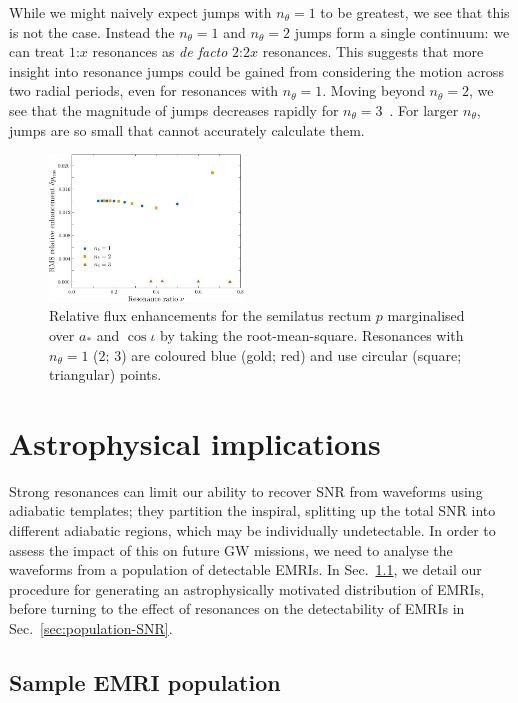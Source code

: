 \documentclass[aps,prd,amsfonts,amssymb,amsmath,nofootinbib,showpacs,superscriptaddress,twocolumn,floatfix]{revtex4-1}
\newcommand{\secref}[1]{Sec.~\ref{sec:#1}}
\begin{document}
While we might naively expect jumps with $n_\theta = 1$ to be greatest, we see that this is not the case. Instead the $n_\theta = 1$ and $n_\theta = 2$ jumps form a single continuum: we can treat $1$:$x$ resonances as \emph{de facto} $2$:$2x$ resonances. This suggests that more insight into resonance jumps could be gained from considering the motion across two radial periods, even for resonances with $n_\theta = 1$. Moving beyond $n_\theta = 2$, we see that the magnitude of jumps decreases rapidly for $n_\theta = 3$~\cite{Flanagan2012a}. For larger $n_\theta$, jumps are so small that cannot accurately calculate them.

\begin{figure}
\centering
\includegraphics[width=0.46\textwidth]{Fig_nu_rms_p}
\caption{\label{fig:res-flux-rms-p-vsnu}Relative flux enhancements for the semilatus rectum $p$ marginalised over $a_\ast$ and $\cos\iota$ by taking the root-mean-square. Resonances with $n_\theta = 1$ ($2$; $3$) are coloured blue (gold; red) and use circular (square; triangular) points.}
\end{figure}

\section{Astrophysical implications}
\label{sec:astrophysics}

Strong resonances can limit our ability to recover SNR from waveforms using adiabatic templates; they partition the inspiral, splitting up the total SNR into different adiabatic regions, which may be individually undetectable. In order to assess the impact of this on future GW missions, we need to analyse the waveforms from a population of detectable EMRIs. In \secref{EMRI-population}, we detail our procedure for generating an astrophysically motivated distribution of EMRIs, before turning to the effect of resonances on the detectability of EMRIs in \secref{population-SNR}.

\subsection{Sample EMRI population}
\label{sec:EMRI-population}
\end{document}
